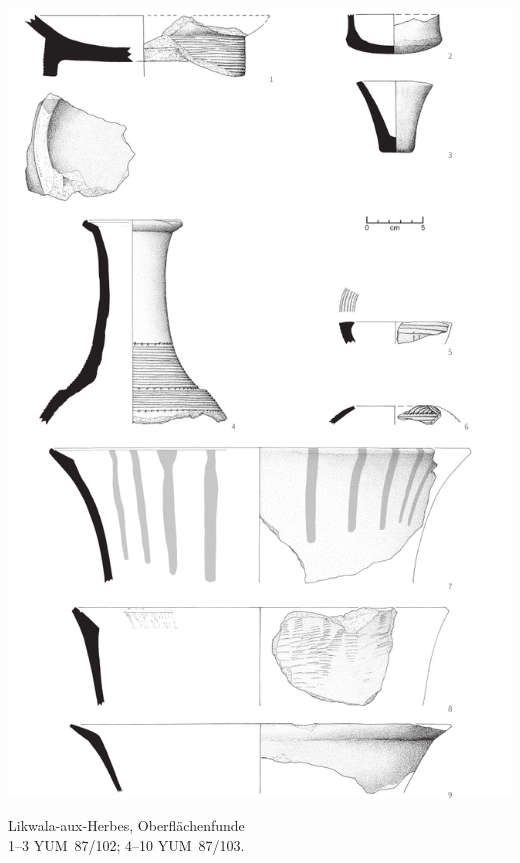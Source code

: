 \begin{pl}[H]
	\includegraphics{plt/Taf74.pdf}
	\vspace{.75em}\caption{Likwala-aux-Herbes, Oberflächenfunde \\ 1--3 YUM~87/102; 4--10 YUM~87/103.}
	\label{pl:74}
\end{pl}

